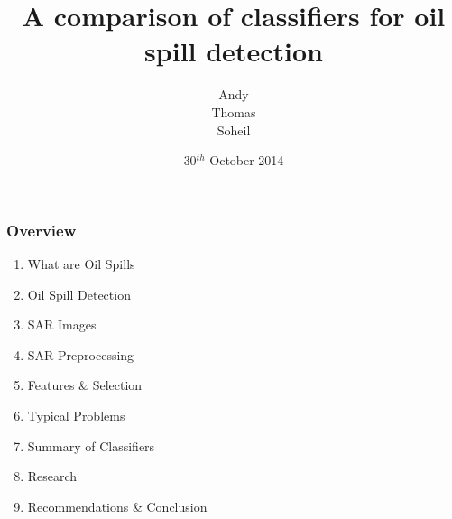 \documentclass{beamer}
\title[Comparison of classifiers]{A comparison of classifiers for oil spill detection} %
\institute[TUDelft] %
{
Delft University of Technology \\ %
\medskip
}
\date{30$^{th}$ October 2014}
\author{Andy\\ Thomas\\ Soheil} %
\begin{document}
\begin{frame}
\titlepage %
\end{frame}

\begin{frame}
\frametitle{Overview} %
\begin{enumerate}
	\item What are Oil Spills
	\item Oil Spill Detection
	\item SAR Images
	\item SAR Preprocessing
	\item Features \& Selection	
	\item Typical Problems
	\item Summary of Classifiers 
	\item Research
	\item Recommendations \& Conclusion
\end{enumerate}

\end{frame}



\end{document}

